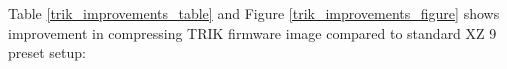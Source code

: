 \documentclass[conference]{IEEEtran}
\begin{document}
%


%

Table \ref{trik_improvements_table} and Figure \ref{trik_improvements_figure} shows improvement in compressing TRIK firmware image compared to standard XZ 9 preset setup:
\end{document}

